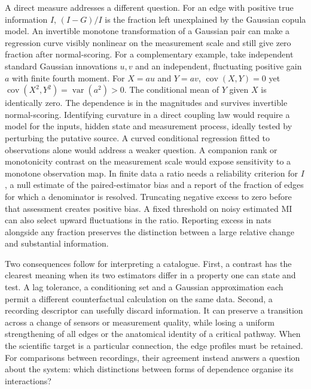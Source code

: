 \documentclass[pdflatex,sn-nature,iicol]{sn-jnl}
\begin{document}
A direct measure addresses a different question. For an edge with positive true information $I$, $(I-G)/I$ is the fraction left unexplained by the Gaussian copula model. An invertible monotone transformation of a Gaussian pair can make a regression curve visibly nonlinear on the measurement scale and still give zero fraction after normal-scoring. For a complementary example, take independent standard Gaussian innovations $u,v$ and an independent, fluctuating positive gain $a$ with finite fourth moment. For $X=au$ and $Y=av$, $\operatorname{cov}(X,Y)=0$ yet $\operatorname{cov}(X^2,Y^2)=\operatorname{var}(a^2)>0$. The conditional mean of $Y$ given $X$ is identically zero. The dependence is in the magnitudes and survives invertible normal-scoring. Identifying curvature in a direct coupling law would require a model for the inputs, hidden state and measurement process, ideally tested by perturbing the putative source. A curved conditional regression fitted to observations alone would address a weaker question. A companion rank or monotonicity contrast on the measurement scale would expose sensitivity to a monotone observation map. In finite data a ratio needs a reliability criterion for $I$, a null estimate of the paired-estimator bias and a report of the fraction of edges for which a denominator is resolved. Truncating negative excess to zero before that assessment creates positive bias. A fixed threshold on noisy estimated MI can also select upward fluctuations in the ratio. Reporting excess in nats alongside any fraction preserves the distinction between a large relative change and substantial information.

Two consequences follow for interpreting a catalogue. First, a contrast has the clearest meaning when its two estimators differ in a property one can state and test. A lag tolerance, a conditioning set and a Gaussian approximation each permit a different counterfactual calculation on the same data. Second, a recording descriptor can usefully discard information. It can preserve a transition across a change of sensors or measurement quality, while losing a uniform strengthening of all edges or the anatomical identity of a critical pathway. When the scientific target is a particular connection, the edge profiles must be retained. For comparisons between recordings, their agreement instead answers a question about the system: which distinctions between forms of dependence organise its interactions?

\ifnature\backmatter\fi
\ifnature\else\fi

\end{document}
